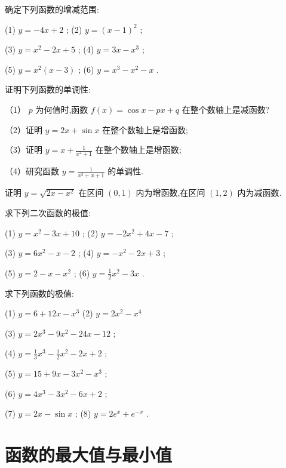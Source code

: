 \documentclass[lang=cn,newtx,12pt,scheme=chinese]{elegantbook}
\begin{document}
\begin{problemset}[习 题 十]

\item 确定下列函数的增减范围:

(1) \(y = - {4x} + 2\) ; (2) \(y = {\left( x - 1\right) }^{2}\) ;

(3) \(y = {x}^{2} - {2x} + 5\) ; (4) \(y = {3x} - {x}^{3}\) ;

(5) \(y = {x}^{2}\left( {x - 3}\right)\) ; (6) \(y = {x}^{3} - {x}^{2} - x\) .

\item 证明下列函数的单调性:

（1） \(p\) 为何值时,函数 \(f\left( x\right) = \cos x - {px} + q\) 在整个数轴上是减函数?

（2）证明 \(y = {2x} + \sin x\) 在整个数轴上是增函数;

（3）证明 \(y = x + \frac{1}{{x}^{2} + 1}\) 在整个数轴上是增函数;

（4）研究函数 \(y = \frac{1}{{x}^{2} + x + 1}\) 的单调性.

\item 证明 \(y = \sqrt{{2x} - {x}^{2}}\) 在区间 \(\left( {0,1}\right)\) 内为增函数,在区间 \(\left( {1,2}\right)\) 内为减函数.

\item 求下列二次函数的极值:

(1) \(y = {x}^{2} - {3x} + {10}\) ; (2) \(y = - 2{x}^{2} + {4x} - 7\) ;

(3) \(y = 6{x}^{2} - x - 2\) ; (4) \(y = - {x}^{2} - {2x} + 3\) ;

(5) \(y = 2 - x - {x}^{2}\) ; (6) \(y = \frac{1}{2}{x}^{2} - {3x}\) .

\item 求下列函数的极值:

(1) \(y = 6 + {12x} - {x}^{3}\) (2) \(y = 2{x}^{2} - {x}^{4}\)

(3) \(y = 2{x}^{3} - 9{x}^{2} - {24x} - {12}\) ;

(4) \(y = \frac{1}{3}{x}^{3} - \frac{1}{2}{x}^{2} - {2x} + 2\) ;

(5) \(y = {15} + {9x} - 3{x}^{2} - {x}^{3}\) ;

(6) \(y = 4{x}^{3} - 3{x}^{2} - {6x} + 2\) ;

(7) \(y = {2x} - \sin x\) ; (8) \(y = 2{e}^{x} + {e}^{-x}\) .

\end{problemset}

\section{函数的最大值与最小值}
\end{document}
